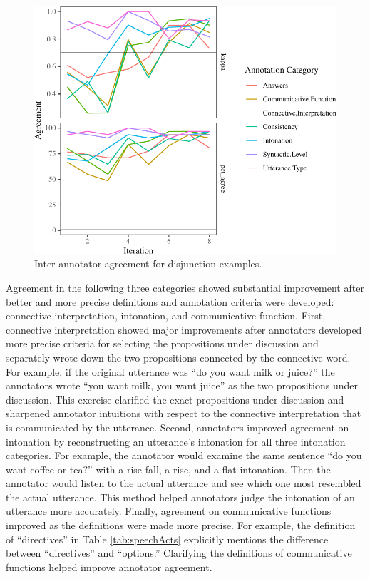 \documentclass[
  english,
  ,man,floatsintext]{apa6}
\begin{document}
\begin{figure}[H]

{\centering \includegraphics{figs/oReliabilityPlot-1} 

}

\caption{Inter-annotator agreement for disjunction examples.}\label{fig:oReliabilityPlot}
\end{figure}

Agreement in the following three categories showed substantial improvement after better and more precise definitions and annotation criteria were developed: connective interpretation, intonation, and communicative function. First, connective interpretation showed major improvements after annotators developed more precise criteria for selecting the propositions under discussion and separately wrote down the two propositions connected by the connective word. For example, if the original utterance was ``do you want milk or juice?'' the annotators wrote ``you want milk, you want juice'' as the two propositions under discussion. This exercise clarified the exact propositions under discussion and sharpened annotator intuitions with respect to the connective interpretation that is communicated by the utterance. Second, annotators improved agreement on intonation by reconstructing an utterance's intonation for all three intonation categories. For example, the annotator would examine the same sentence ``do you want coffee or tea?'' with a rise-fall, a rise, and a flat intonation. Then the annotator would listen to the actual utterance and see which one most resembled the actual utterance. This method helped annotators judge the intonation of an utterance more accurately. Finally, agreement on communicative functions improved as the definitions were made more precise. For example, the definition of ``directives'' in Table \ref{tab:speechActs} explicitly mentions the difference between ``directives'' and ``options.'' Clarifying the definitions of communicative functions helped improve annotator agreement.
\end{document}
